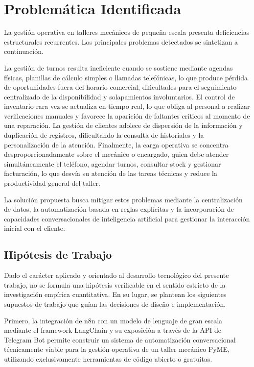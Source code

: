 \documentclass[12pt,a4paper]{report}
\begin{document}
\section{Problemática Identificada}

La gestión operativa en talleres mecánicos de pequeña escala presenta deficiencias estructurales recurrentes. Los principales problemas detectados se sintetizan a continuación.

La gestión de turnos resulta ineficiente cuando se sostiene mediante agendas físicas, planillas de cálculo simples o llamadas telefónicas, lo que produce pérdida de oportunidades fuera del horario comercial, dificultades para el seguimiento centralizado de la disponibilidad y solapamientos involuntarios. El control de inventario rara vez se actualiza en tiempo real, lo que obliga al personal a realizar verificaciones manuales y favorece la aparición de faltantes críticos al momento de una reparación. La gestión de clientes adolece de dispersión de la información y duplicación de registros, dificultando la consulta de historiales y la personalización de la atención. Finalmente, la carga operativa se concentra desproporcionadamente sobre el mecánico o encargado, quien debe atender simultáneamente el teléfono, agendar turnos, consultar stock y gestionar facturación, lo que desvía su atención de las tareas técnicas y reduce la productividad general del taller.

La solución propuesta busca mitigar estos problemas mediante la centralización de datos, la automatización basada en reglas explícitas y la incorporación de capacidades conversacionales de inteligencia artificial para gestionar la interacción inicial con el cliente.

\subsection{Hipótesis de Trabajo}

Dado el carácter aplicado y orientado al desarrollo tecnológico del presente trabajo, no se formula una hipótesis verificable en el sentido estricto de la investigación empírica cuantitativa. En su lugar, se plantean los siguientes supuestos de trabajo que guían las decisiones de diseño e implementación.

Primero, la integración de n8n con un modelo de lenguaje de gran escala mediante el framework LangChain y su exposición a través de la API de Telegram Bot permite construir un sistema de automatización conversacional técnicamente viable para la gestión operativa de un taller mecánico PyME, utilizando exclusivamente herramientas de código abierto o gratuitas.
\end{document}
